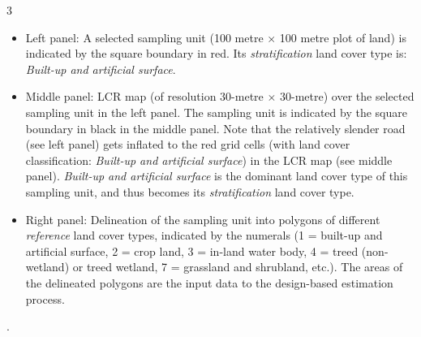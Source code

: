 \begin{center}
\begin{minipage}{6.5in}
\begin{tcolorbox}[arc=8px, colback=white, colframe=black]
\begin{center}
\begin{multicols}{3}
\end{multicols}
\end{center}
\small
\begin{itemize}
\item
    \vskip -0.5cm
    Left panel: A selected sampling unit (100 metre $\times$ 100 metre plot of land)
    is indicated by the square boundary in red.
    Its \textit{stratification} land cover type is: \textit{Built-up and artificial surface}.
\item
    Middle panel: LCR map \cite{StatCanCoELCR2025} (of resolution 30-metre $\times$ 30-metre)
    over the selected sampling unit in the left panel.
    The sampling unit is indicated by the square boundary in black in the middle panel.
    Note that the relatively slender road (see left panel) gets inflated
    to the red grid cells (with land cover classification: \textit{Built-up and artificial surface})
    in the LCR map (see middle panel).
    \textit{Built-up and artificial surface} is the dominant land cover type of this sampling unit,
    and thus becomes its \textit{stratification} land cover type.
\item
    Right panel:
    Delineation of the sampling unit into polygons of different
    \textit{reference} land cover types,
    indicated by the numerals (1 = built-up and artificial surface, 2 = crop land, 3 = in-land water body,
    4 = treed (non-wetland) or treed wetland,
    7 = grassland and shrubland, etc.).
    The areas of the delineated polygons are the input data
    to the design-based estimation process.
\end{itemize}
\vskip -0.4cm
{\color{white}.}
\end{tcolorbox}
\end{minipage}
\end{center}










